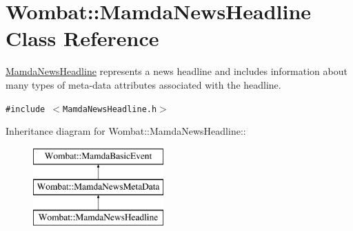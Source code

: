 \hypertarget{classWombat_1_1MamdaNewsHeadline}{
\section{Wombat::Mamda\-News\-Headline Class Reference}
\label{classWombat_1_1MamdaNewsHeadline}
}
\hyperlink{classWombat_1_1MamdaNewsHeadline}{Mamda\-News\-Headline} represents a news headline and includes information about many types of meta-data attributes associated with the headline.  


{\tt \#include $<$Mamda\-News\-Headline.h$>$}

Inheritance diagram for Wombat::Mamda\-News\-Headline::\begin{figure}[H]
\begin{center}
\leavevmode
\includegraphics[height=3cm]{classWombat_1_1MamdaNewsHeadline}
\end{center}
\end{figure}
